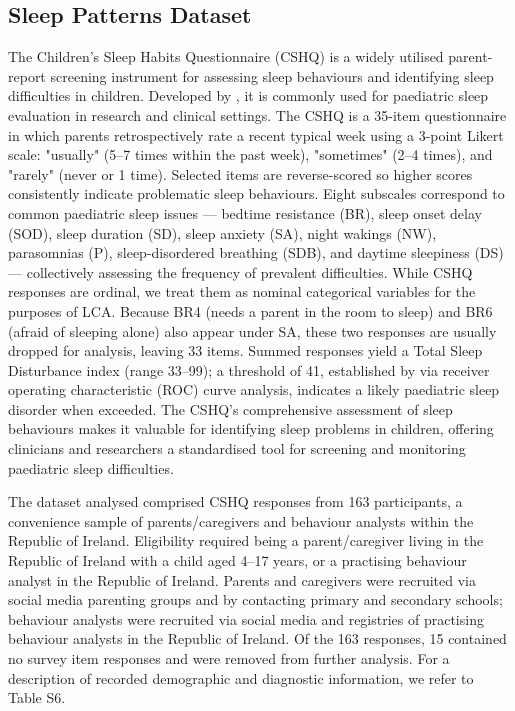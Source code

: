 \documentclass[11pt]{article}
\theoremstyle{plain}
\theoremstyle{definition}
\begin{document}
\subsection{Sleep Patterns Dataset}\label{subsec:sleep_data}

The Children’s Sleep Habits Questionnaire (CSHQ) is a widely utilised parent-report screening instrument for assessing sleep behaviours and identifying sleep difficulties in children. Developed by \citet{owens_childrens_2000}, it is commonly used for paediatric sleep evaluation in research and clinical settings. The CSHQ is a 35-item questionnaire in which parents retrospectively rate a recent typical week using a 3-point Likert scale: "usually" (5–7 times within the past week), "sometimes" (2–4 times), and "rarely" (never or 1 time). Selected items are reverse-scored so higher scores consistently indicate problematic sleep behaviours. Eight subscales correspond to common paediatric sleep issues — bedtime resistance (BR), sleep onset delay (SOD), sleep duration (SD), sleep anxiety (SA), night wakings (NW), parasomnias (P), sleep-disordered breathing (SDB), and daytime sleepiness (DS) — collectively assessing the frequency of prevalent difficulties. While CSHQ responses are ordinal, we treat them as nominal categorical variables for the purposes of LCA. Because BR4 (needs a parent in the room to sleep) and BR6 (afraid of sleeping alone) also appear under SA, these two responses are usually dropped for analysis, leaving 33 items. Summed responses yield a Total Sleep Disturbance index (range 33–99); a threshold of 41, established by \citet{owens_childrens_2000} via receiver operating characteristic (ROC) curve analysis, indicates a likely paediatric sleep disorder when exceeded. The CSHQ’s comprehensive assessment of sleep behaviours makes it valuable for identifying sleep problems in children, offering clinicians and researchers a standardised tool for screening and monitoring paediatric sleep difficulties.



The dataset analysed comprised CSHQ responses from 163 participants, a convenience sample of parents/caregivers and behaviour analysts within the Republic of Ireland. Eligibility required being a parent/caregiver living in the Republic of Ireland with a child aged 4–17 years, or a practising behaviour analyst in the Republic of Ireland. Parents and caregivers were recruited via social media parenting groups and by contacting primary and secondary schools; behaviour analysts were recruited via social media and registries of practising behaviour analysts in the Republic of Ireland. Of the 163 responses, 15 contained no survey item responses and were removed from further analysis. For a description of recorded demographic and diagnostic information, we refer to Table S6.
\end{document}
